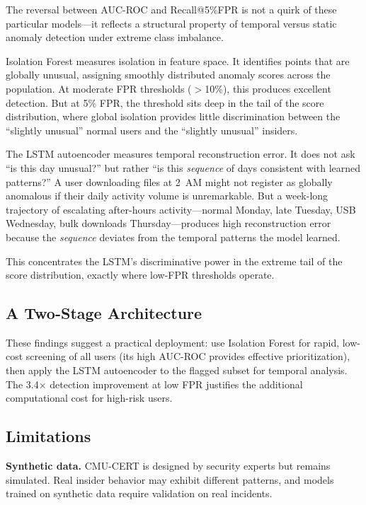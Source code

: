 \documentclass[conference]{IEEEtran}
\begin{document}
The reversal between AUC-ROC and Recall@5\%FPR is not a quirk of these particular models---it reflects a structural property of temporal versus static anomaly detection under extreme class imbalance.

Isolation Forest measures isolation in feature space. It identifies points that are globally unusual, assigning smoothly distributed anomaly scores across the population. At moderate FPR thresholds ($>$10\%), this produces excellent detection. But at 5\% FPR, the threshold sits deep in the tail of the score distribution, where global isolation provides little discrimination between the ``slightly unusual'' normal users and the ``slightly unusual'' insiders.

The LSTM autoencoder measures temporal reconstruction error. It does not ask ``is this day unusual?'' but rather ``is this \textit{sequence} of days consistent with learned patterns?'' A user downloading files at 2~AM might not register as globally anomalous if their daily activity volume is unremarkable. But a week-long trajectory of escalating after-hours activity---normal Monday, late Tuesday, USB Wednesday, bulk downloads Thursday---produces high reconstruction error because the \textit{sequence} deviates from the temporal patterns the model learned.

This concentrates the LSTM's discriminative power in the extreme tail of the score distribution, exactly where low-FPR thresholds operate.

\subsection{A Two-Stage Architecture}

These findings suggest a practical deployment: use Isolation Forest for rapid, low-cost screening of all users (its high AUC-ROC provides effective prioritization), then apply the LSTM autoencoder to the flagged subset for temporal analysis. The 3.4$\times$ detection improvement at low FPR justifies the additional computational cost for high-risk users.

\subsection{Limitations}

\textbf{Synthetic data.} CMU-CERT is designed by security experts but remains simulated. Real insider behavior may exhibit different patterns, and models trained on synthetic data require validation on real incidents.
\end{document}
